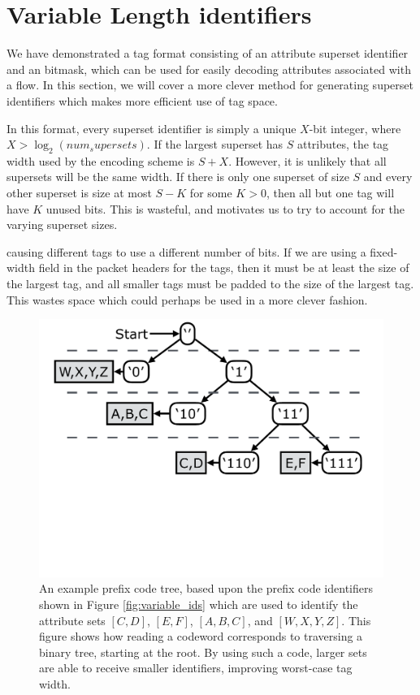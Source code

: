 \section{Variable Length identifiers}\label{sec:identifiers}
We have demonstrated a tag format consisting of an attribute superset identifier and an bitmask, which can be used for easily decoding attributes associated with a flow. In this section, we will cover a more clever method for generating superset identifiers which makes more efficient use of tag space. 

In this format, every superset identifier is simply a unique $X$-bit integer, where $X > \log_2(num_supersets)$. If the largest superset has $S$ attributes, the tag width used by the encoding scheme is $S + X$. However, it is unlikely that all supersets will be the same width. If there is only one superset of size $S$ and every other superset is size at most $S-K$ for some $K > 0$, then all but one tag will have $K$ unused bits. This is wasteful, and motivates us to try to account for the varying superset sizes. 

 causing different tags to use a different number of bits. If we are using a fixed-width field in the packet headers for the tags, then it must be at least the size of the largest tag, and all smaller tags must be padded to the size of the largest tag. This wastes space which could perhaps be used in a more clever fashion.

\begin{figure}[t!] 
\begin{minipage}{1\linewidth}
\includegraphics[trim={0 10cm 0 0}, clip, width=\linewidth]{figures/code_tree}
\end{minipage} 
\caption{An example prefix code tree, based upon the prefix code identifiers shown in Figure \ref{fig:variable_ids} which are used to identify the attribute sets $[C,D]$, $[E,F]$, $[A,B,C]$, and $[W,X,Y,Z]$. This figure shows how reading a codeword corresponds to traversing a binary tree, starting at the root. By using such a code, larger sets are able to receive smaller identifiers, improving worst-case tag width.}
\label{fig:code_tree}
\end{figure}

